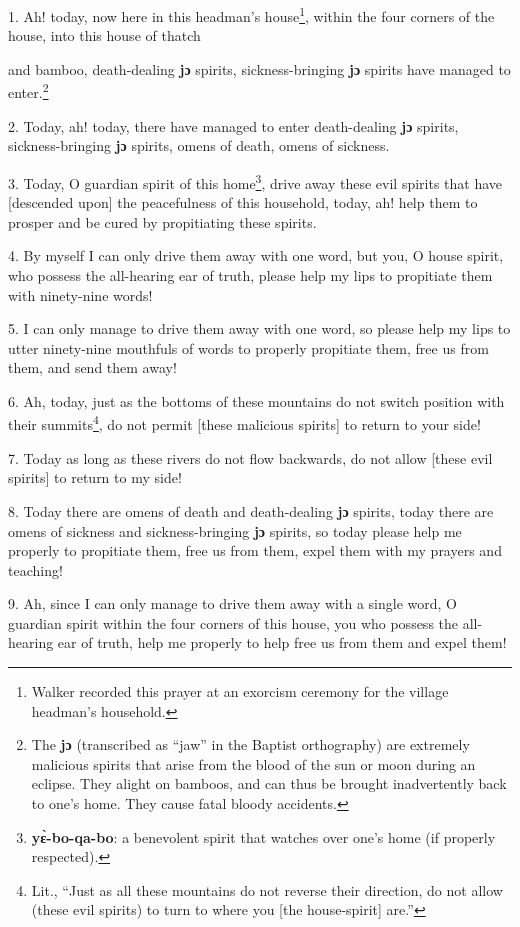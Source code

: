 \setcounter{footnote}{0}

1. Ah! today, now here in this headman's house\footnote{Walker recorded this prayer at an exorcism ceremony for the village headman's household.}, within the four corners of the
house, into this house of thatch

and bamboo, death-dealing\textbf{ jɔ} spirits, sickness-bringing\textbf{ jɔ}
spirits have managed to enter.\footnote{The \textbf{jɔ} (transcribed as ``jaw'' in the Baptist orthography) are extremely malicious spirits that arise from the blood of the sun or moon during an eclipse. They alight on bamboos, and can thus be brought inadvertently back to one's home. They cause fatal bloody accidents.}

2. Today, ah! today, there have managed to enter death-dealing \textbf{jɔ} spirits,
sickness-bringing\textbf{ jɔ} spirits, omens of death, omens of sickness.

3. Today, O guardian spirit of this home\footnote{\textbf{yɛ̀-bo-qa-bo}: a benevolent spirit that watches over one's home (if properly respected).}, drive away these evil spirits that
have [descended upon] the peacefulness of this household, today, ah! help them
to prosper and be cured by propitiating these spirits.

4. By myself I can only drive them away with one word, but you, O house spirit,
who possess the all-hearing ear of truth, please help my lips to propitiate them
with ninety-nine words!

5. I can only manage to drive them away with one word, so please help my lips to
utter ninety-nine mouthfuls of words to properly propitiate them, free us from
them, and send them away!

6. Ah, today, just as the bottoms of these mountains do not switch position with
their summits\footnote{Lit., ``Just as all these mountains do not reverse their direction, do not allow (these evil spirits) to turn to where you [the house-spirit] are.''}, do not permit [these malicious spirits] to return to your side!

7. Today as long as these rivers do not flow backwards, do not allow [these evil
spirits] to return to my side!

8. Today there are omens of death and death-dealing\textbf{ jɔ} spirits, today
there are omens of sickness and sickness-bringing\textbf{ jɔ} spirits, so today
please help me properly to propitiate them, free us from them, expel them with
my prayers and teaching!

9. Ah, since I can only manage to drive them away with a single word, O guardian
spirit within the four corners of this house, you who possess the all-hearing ear
of truth, help me properly to help free us from them and expel them!

